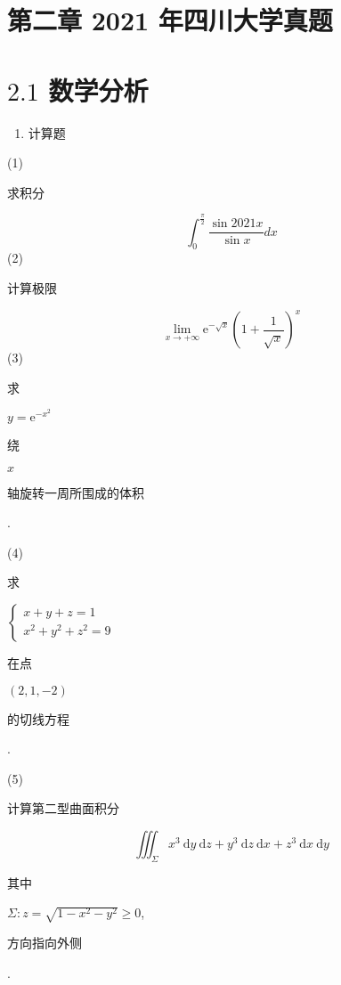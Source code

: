 \documentclass[10pt]{article}
\begin{document}
\section{第二章 2021 年四川大学真题}
\section{$2.1$ 数学分析}
\begin{enumerate}
  \item \begin{CJK}{UTF8}{mj}计算题\end{CJK}
\end{enumerate}
(1) \begin{CJK}{UTF8}{mj}求积分\end{CJK}
$$
\int_{0}^{\frac{\pi}{2}} \frac{\sin 2021 x}{\sin x} d x
$$
(2) \begin{CJK}{UTF8}{mj}计算极限\end{CJK}
$$
\lim _{x \rightarrow+\infty} \mathrm{e}^{-\sqrt{x}}\left(1+\frac{1}{\sqrt{x}}\right)^{x}
$$
(3) \begin{CJK}{UTF8}{mj}求\end{CJK} $y=\mathrm{e}^{-x^{2}}$ \begin{CJK}{UTF8}{mj}绕\end{CJK} $x$ \begin{CJK}{UTF8}{mj}轴旋转一周所围成的体积\end{CJK}.

(4) \begin{CJK}{UTF8}{mj}求\end{CJK} $\left\{\begin{array}{l}x+y+z=1 \\ x^{2}+y^{2}+z^{2}=9\end{array}\right.$ \begin{CJK}{UTF8}{mj}在点\end{CJK} $(2,1,-2)$ \begin{CJK}{UTF8}{mj}的切线方程\end{CJK}.

(5) \begin{CJK}{UTF8}{mj}计算第二型曲面积分\end{CJK}
$$
\iiint_{\Sigma} x^{3} \mathrm{~d} y \mathrm{~d} z+y^{3} \mathrm{~d} z \mathrm{~d} x+z^{3} \mathrm{~d} x \mathrm{~d} y
$$
\begin{CJK}{UTF8}{mj}其中\end{CJK} $\Sigma: z=\sqrt{1-x^{2}-y^{2}} \geq 0$, \begin{CJK}{UTF8}{mj}方向指向外侧\end{CJK}.
\end{document}
